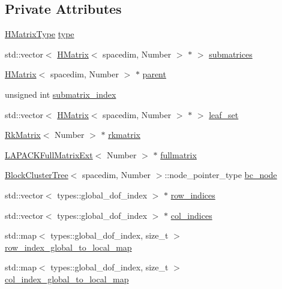 \subsection*{Private Attributes}
\begin{DoxyCompactItemize}
\item 
\hyperlink{hmatrix_8h_ac04719e202c88f36e4533fe1d326a494}{H\+Matrix\+Type} \hyperlink{classHMatrix_a89ef60f3ba737c04708195ca0bb13620}{type}
\item 
std\+::vector$<$ \hyperlink{classHMatrix}{H\+Matrix}$<$ spacedim, Number $>$ $\ast$ $>$ \hyperlink{classHMatrix_a4bd1b9a32f2c7693e603a7c6ea916e4f}{submatrices}
\item 
\hyperlink{classHMatrix}{H\+Matrix}$<$ spacedim, Number $>$ $\ast$ \hyperlink{classHMatrix_a71690997092a4142799b2fa2dbf53db4}{parent}
\item 
unsigned int \hyperlink{classHMatrix_a64c851dd63ba1a466c19f451be369475}{submatrix\+\_\+index}
\item 
std\+::vector$<$ \hyperlink{classHMatrix}{H\+Matrix}$<$ spacedim, Number $>$ $\ast$ $>$ \hyperlink{classHMatrix_a61dbd471077be0ad8325d0f2afe3d43f}{leaf\+\_\+set}
\item 
\hyperlink{classRkMatrix}{Rk\+Matrix}$<$ Number $>$ $\ast$ \hyperlink{classHMatrix_aa97a8f5e42aba0f1d5faf41f35a27819}{rkmatrix}
\item 
\hyperlink{classLAPACKFullMatrixExt}{L\+A\+P\+A\+C\+K\+Full\+Matrix\+Ext}$<$ Number $>$ $\ast$ \hyperlink{classHMatrix_a328134c9e9cb2c4b05d5431c0ca8a533}{fullmatrix}
\item 
\hyperlink{classBlockClusterTree}{Block\+Cluster\+Tree}$<$ spacedim, Number $>$\+::node\+\_\+pointer\+\_\+type \hyperlink{classHMatrix_a4a304494c970b5b267be1d8459d51586}{bc\+\_\+node}
\item 
std\+::vector$<$ types\+::global\+\_\+dof\+\_\+index $>$ $\ast$ \hyperlink{classHMatrix_a33b3a936f1b40e320e96d47471da07ae}{row\+\_\+indices}
\item 
std\+::vector$<$ types\+::global\+\_\+dof\+\_\+index $>$ $\ast$ \hyperlink{classHMatrix_ac30ae65e37ec5e4ccc7de2f6b9ea91e6}{col\+\_\+indices}
\item 
std\+::map$<$ types\+::global\+\_\+dof\+\_\+index, size\+\_\+t $>$ \hyperlink{classHMatrix_a4d64145335fc0521603b206a22a67578}{row\+\_\+index\+\_\+global\+\_\+to\+\_\+local\+\_\+map}
\item 
std\+::map$<$ types\+::global\+\_\+dof\+\_\+index, size\+\_\+t $>$ \hyperlink{classHMatrix_ab337c7b4f2f40699b9b7f3ab17a1e056}{col\+\_\+index\+\_\+global\+\_\+to\+\_\+local\+\_\+map}

\end{DoxyCompactItemize}
